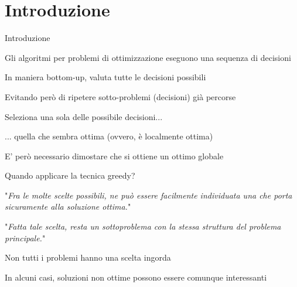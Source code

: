 \section{Introduzione}

\begin{frame}{Introduzione}

\vspace{-9pt}
\begin{myboxtitle}
\BI
\item Gli algoritmi per problemi di ottimizzazione eseguono una sequenza di decisioni
\EI
\end{myboxtitle}

\begin{myboxtitle}
\BI
\item In maniera bottom-up, valuta tutte le decisioni possibili
\item Evitando però di ripetere sotto-problemi (decisioni) già percorse
\EI
\end{myboxtitle}

\begin{myboxtitle}
\BI
\item Seleziona una sola delle possibile decisioni...
\item ... quella che sembra ottima (ovvero, è localmente ottima)
\item E' però necessario dimostare che si ottiene un ottimo globale
\EI
\end{myboxtitle}
\end{frame}


\begin{frame}{Quando applicare la tecnica greedy?}

\vspace{-9pt}
\begin{myboxtitle}
"\emph{Fra le molte scelte possibili, ne può essere facilmente individuata una che porta sicuramente alla soluzione ottima.}"
\end{myboxtitle}

\begin{myboxtitle}
"\emph{Fatta tale scelta, resta un sottoproblema con la stessa struttura del problema principale.}"
\end{myboxtitle}

\begin{myboxtitle}[Note]
\BI
\item Non tutti i problemi hanno una scelta ingorda
\item In alcuni casi, soluzioni non ottime possono essere comunque interessanti
\EI
\end{myboxtitle}

\end{frame}

